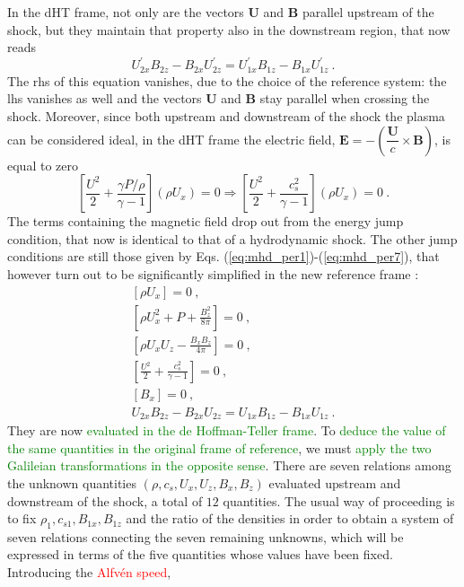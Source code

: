 \documentclass[12pt,a4paper]{article}
\renewcommand{\vec}[1]{\boldsymbol{#1}}
\begin{document}
In the dHT frame, not only are the vectors $\vec{U}$ and $\vec{B}$ parallel upstream of the shock, but they maintain that property also in the downstream region, that now reads
\begin{equation}
U_{2x}^\prime B_{2z} -B_{2x}U_{2z}^\prime = U_{1x}^\prime B_{1z} -B_{1x}U_{1z}^\prime ~.
\end{equation}
The rhs of this equation vanishes, due to the choice of the reference system: the lhs vanishes as well and the vectors $\vec{U}$ and $\vec{B}$ stay parallel when crossing the shock. Moreover, since both upstream and downstream of the shock the plasma can be considered ideal, in the dHT frame the electric field, $\vec{E} = -\left(\dfrac{\vec{U}}{c} \times \vec{B} \right)$, is equal to zero 
\begin{equation}
\left[\dfrac{U^2}{2} + \dfrac{\gamma P/\rho }{\gamma -1}\right](\rho U_x) = 0 \Longrightarrow \left[\dfrac{U^2}{2} + \dfrac{c_s^2}{\gamma -1}\right](\rho U_x) = 0 ~.
\end{equation}
The terms containing the magnetic field drop out from the energy jump condition, that now is identical to that of a hydrodynamic shock. The other jump conditions are still those given by Eqs. (\ref{eq:mhd_per1})-(\ref{eq:mhd_per7}), that however turn out to be significantly simplified in the new reference frame :
\begin{eqnarray*}
\left[ \rho U_x \right] = 0 ~, \\
\left[ \rho U_x^2 +P +\frac{B_z^2}{8\pi} \right] = 0 ~, \\
\left[ \rho U_x U_z -\frac{B_x B_z}{4\pi} \right] = 0 ~, \\
\left[\frac{U^2}{2} +\frac{c_s^2}{\gamma -1} \right] = 0 ~, \\
\left[ B_x \right] = 0 ~, \\
U_{2x} B_{2z} -B_{2x} U_{2z} = U_{1x} B_{1z} -B_{1x} U_{1z} ~.
\end{eqnarray*}
They are now \textcolor{green}{evaluated in the de Hoffman-Teller frame}. To \textcolor{green}{deduce the value of the same quantities in the original frame of reference}, we must \textcolor{green}{apply the two Galileian transformations in the opposite sense}. There are seven relations among the unknown quantities $(\rho, c_s, U_x, U_z, B_x, B_z)$ evaluated upstream and downstream of the shock, a total of $12$ quantities. The usual way of proceeding is to fix $\rho_1, c_{s1}, B_{1x}, B_{1z}$ and the ratio of the densities in order to obtain a system of seven relations connecting the seven remaining unknowns, which will be expressed in terms of the five quantities whose values have been fixed. Introducing the \textcolor{red}{Alfv\'{e}n speed},
\end{document}
